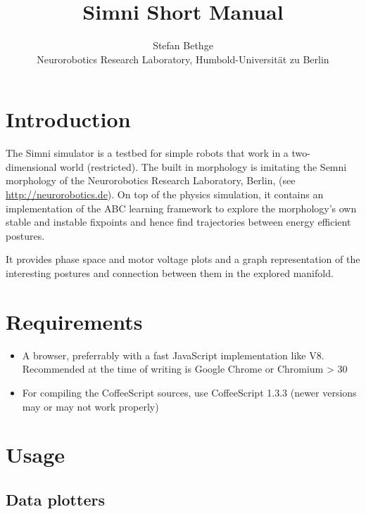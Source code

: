 \documentclass[10pt,a4paper]{article}
\begin{document}
\title{Simni Short Manual}
\author{Stefan Bethge\\
Neurorobotics Research Laboratory, Humbold-Universität zu Berlin}

\maketitle
\tableofcontents
\newpage
{}

\section{Introduction}

The Simni simulator is a testbed for simple robots that work in a two-dimensional world (restricted). The built in morphology is imitating the Semni morphology of the Neurorobotics Research Laboratory, Berlin, (see \url{http://neurorobotics.de}).
On top of the physics simulation, it contains an implementation of the ABC learning framework to explore the morphology's own stable and instable fixpoints and hence find trajectories between energy efficient postures. 

It provides phase space and motor voltage plots and a graph representation of the interesting postures and connection between them in the explored manifold.

\section{Requirements}

\begin{itemize}
\item A browser, preferrably with a fast JavaScript implementation like V8. Recommended at the time of writing is Google Chrome or Chromium > 30
\item For compiling the CoffeeScript sources, use CoffeeScript 1.3.3 (newer versions may or may not work properly)

\end{itemize}

\section{Usage}

\subsection{Data plotters}
\end{document}
